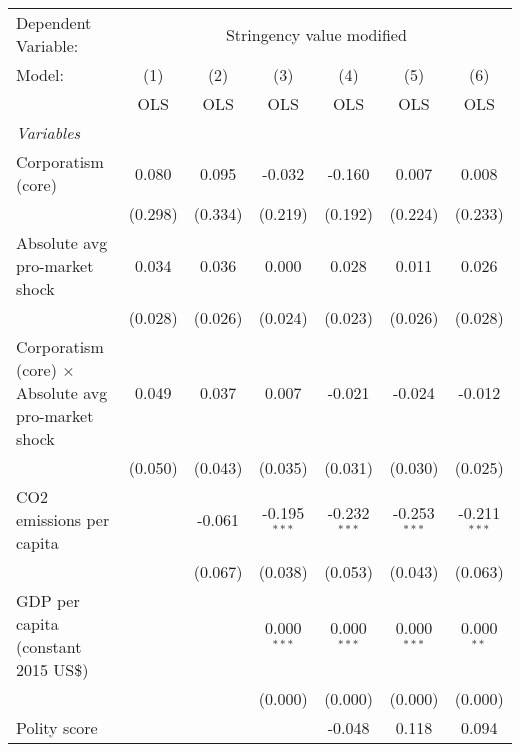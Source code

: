 
\begingroup
\centering
\begin{tabular}{lcccccc}
   \toprule
   Dependent Variable: & \multicolumn{6}{c}{Stringency value modified}\\
   Model:                                                     & (1)     & (2)     & (3)            & (4)            & (5)            & (6)\\  
                                                              &  OLS    & OLS     & OLS            & OLS            & OLS            & OLS\\  
   \midrule
   \emph{Variables}\\
   Corporatism (core)                                         & 0.080   & 0.095   & -0.032         & -0.160         & 0.007          & 0.008\\   
                                                              & (0.298) & (0.334) & (0.219)        & (0.192)        & (0.224)        & (0.233)\\   
   Absolute avg pro-market shock                              & 0.034   & 0.036   & 0.000          & 0.028          & 0.011          & 0.026\\   
                                                              & (0.028) & (0.026) & (0.024)        & (0.023)        & (0.026)        & (0.028)\\   
   Corporatism (core) $\times$ Absolute avg pro-market shock  & 0.049   & 0.037   & 0.007          & -0.021         & -0.024         & -0.012\\   
                                                              & (0.050) & (0.043) & (0.035)        & (0.031)        & (0.030)        & (0.025)\\   
   CO2 emissions per capita                                   &         & -0.061  & -0.195$^{***}$ & -0.232$^{***}$ & -0.253$^{***}$ & -0.211$^{***}$\\   
                                                              &         & (0.067) & (0.038)        & (0.053)        & (0.043)        & (0.063)\\   
   GDP per capita (constant 2015 US\$)                        &         &         & 0.000$^{***}$  & 0.000$^{***}$  & 0.000$^{***}$  & 0.000$^{**}$\\   
                                                              &         &         & (0.000)        & (0.000)        & (0.000)        & (0.000)\\   
   Polity score                                               &         &         &                & -0.048         & 0.118          & 0.094\\   

\end{tabular}
